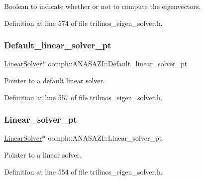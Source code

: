 Boolean to indicate whether or not to compute the eigenvectors. 



Definition at line 574 of file trilinos\+\_\+eigen\+\_\+solver.\+h.

\mbox{\label{classoomph_1_1ANASAZI_a0d68fe86419ff9260bd2dd8c5e75b1e8}} 
\subsubsection{\texorpdfstring{Default\+\_\+linear\+\_\+solver\+\_\+pt}{Default\_linear\_solver\_pt}}
{\footnotesize\ttfamily \hyperlink{classoomph_1_1LinearSolver}{Linear\+Solver}$\ast$ oomph\+::\+A\+N\+A\+S\+A\+Z\+I\+::\+Default\+\_\+linear\+\_\+solver\+\_\+pt\hspace{0.3cm}{\ttfamily [private]}}



Pointer to a default linear solver. 



Definition at line 557 of file trilinos\+\_\+eigen\+\_\+solver.\+h.

\mbox{\label{classoomph_1_1ANASAZI_a4af90db68a430f129f360c00a669e809}} 
\subsubsection{\texorpdfstring{Linear\+\_\+solver\+\_\+pt}{Linear\_solver\_pt}}
{\footnotesize\ttfamily \hyperlink{classoomph_1_1LinearSolver}{Linear\+Solver}$\ast$ oomph\+::\+A\+N\+A\+S\+A\+Z\+I\+::\+Linear\+\_\+solver\+\_\+pt\hspace{0.3cm}{\ttfamily [private]}}



Pointer to a linear solver. 



Definition at line 554 of file trilinos\+\_\+eigen\+\_\+solver.\+h.

